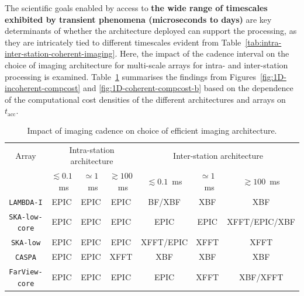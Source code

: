 \documentclass[
  journal=pasa,
  manuscript=article-type,
  year=2020,
  volume=37,
]{cup-journal}
\begin{document}
The scientific goals enabled by access to \textbf{the wide range of timescales exhibited by transient phenomena (microseconds to days)} are key determinants of whether the architecture deployed can support the processing, as they are intricately tied to different timescales evident from Table~\ref{tab:intra-inter-station-coherent-imaging}. Here, the impact of the cadence interval on the choice of imaging architecture for multi-scale arrays for intra- and inter-station processing is examined. Table~\ref{tab:cadence} summarises the findings from Figures~\ref{fig:1D-incoherent-compcost} and \ref{fig:1D-coherent-compcost-b} based on the dependence of the computational cost densities of the different architectures and arrays on $t_\textrm{acc}$.

\begin{table}[htb!]
\normalsize
\begin{threeparttable}
\caption{Impact of imaging cadence on choice of efficient imaging architecture.}
\label{tab:cadence}
\begin{tabular}{c|ccc|ccc}
\toprule
\headrow 
Array & \multicolumn{3}{c|}{Intra-station architecture} & \multicolumn{3}{c}{Inter-station architecture} \\ 
 & $\lesssim 0.1$~ms & $\simeq 1$~ms & $\gtrsim 100$~ms & $\lesssim 0.1$~ms & $\simeq 1$~ms & $\gtrsim 100$~ms \\ 
\midrule\midrule

\texttt{LAMBDA-I} & EPIC & EPIC & EPIC & BF/XBF & XBF & XBF \\
\midrule
\texttt{SKA-low-core} & EPIC & EPIC & EPIC & EPIC & EPIC & XFFT/EPIC/XBF \\
\midrule
\texttt{SKA-low} & EPIC & EPIC & EPIC & XFFT/EPIC & XFFT & XFFT \\
\midrule
\texttt{CASPA} & EPIC & EPIC & XFFT & XBF & XBF & XBF \\
\midrule
\texttt{FarView-core} & EPIC & EPIC & EPIC & EPIC & XFFT & XBF/XFFT \\
\bottomrule
\end{tabular}
\end{threeparttable}
\end{table}
\end{document}
